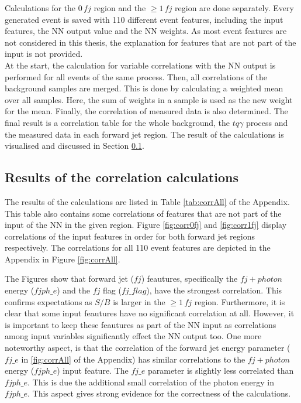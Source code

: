 Calculations for the $0\, fj$ region and the $\geq 1\, fj$ region are done separately.  
Every generated event is saved with 110 different event features, including the input features, the NN output value and the NN weights. As most event features are not considered in this thesis, the explanation for features that are not part of the input is not provided. \\
At the start, the calculation for variable correlations with the NN output is performed for all events of the same process.  
Then, all correlations of the background samples are merged. This is done by calculating a weighted mean over all samples. Here, the sum of weights in a sample is used as the new weight for the mean.
Finally, the correlation of measured data is also determined. The final result is a correlation table for the whole background, the $tq\gamma$ process and the measured data in each forward jet region. 
The result of the calculations is visualised and discussed in Section \ref{sec:corrvis}. 


\subsection{Results of the correlation calculations}
\label{sec:corrvis}
The results of the calculations are listed in Table \ref{tab:corrAll} of the Appendix. This table also contains some correlations of features that are not part of the input of the NN in the given region.  
Figure \ref{fig:corr0fj} and \autoref{fig:corr1fj} display correlations of the input features in order for both forward jet regions respectively. The correlations for all 110 event features are depicted in the Appendix in Figure \ref{fig:corrAll}.

The Figures show that forward jet ($fj$) feautures, specifically the $fj+photon$ energy ($fjph\_e$) and the $fj$ flag ($fj\_flag$), have the strongest correlation. This confirms expectations as $S/B$ is larger in the $\geq 1\, fj$ region. 
Furthermore, it is clear that some input feautures have no significant correlation at all. However, it is important to keep these feautures as part of the NN input as correlations among input variables significantly effect the NN output too. 
One more noteworthy aspect, is that the correlation of the forward jet energy parameter ($fj\_e$ in \autoref{fig:corrAll} of the Appendix) has similar correlations to the $fj+photon$ energy ($fjph\_e$) input feature. 
The $fj\_e$ parameter is slightly less correlated than $fjph\_e$. This is due the additional small correlation of the photon energy in $fjph\_e$. This aspect gives strong evidence for the correctness of the calculations. 


